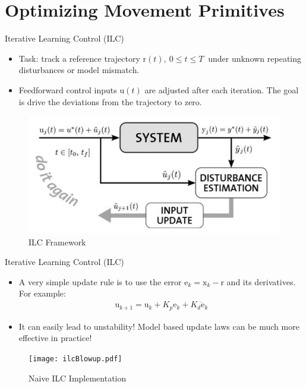 \documentclass[handout]{beamer}
\newcommand{\boldvec}[1]{\boldsymbol{\mathrm{#1}}}
\let\vec\boldvec
\newcommand{\state}{\vec{x}} %
\newcommand{\error}{\vec{e}} %
\newcommand{\traj}{\vec{r}} %
\newcommand{\sysInput}{\vec{u}} %
\begin{document}
\section{Optimizing Movement Primitives}
%
\begin{frame}{Iterative Learning Control (ILC)}
\begin{itemize}
\item Task: track a reference trajectory $\traj(t), \ 0 \leq t \leq T \ $ under unknown repeating disturbances or model mismatch.
\item Feedforward control inputs $\sysInput(t)$ are adjusted after each iteration. The goal is drive the deviations from the trajectory to zero. 
\end{itemize}
\begin{figure}
\center
\includegraphics[scale=0.25]{ilc_framework}			
\caption{ILC Framework}
\end{figure}
\end{frame}
%
\begin{frame}{Iterative Learning Control (ILC)}
\begin{itemize}
\item A very simple update rule is to use the error $\error_k = \state_k - \traj$ and its derivatives. For example:
\begin{equation*}
\begin{aligned}
\sysInput_{k+1} = \sysInput_{k} + K_{p}\error_k + K_{d}\dot{\error}_k
\end{aligned}
\end{equation*}
\item It can easily lead to unstability! Model based update laws can be much more effective in practice!
\end{itemize}
\begin{figure}
\center
\texttt{[image: ilcBlowup.pdf]}			
\caption{Naive ILC Implementation}
\end{figure}
\end{frame}
\end{document}

